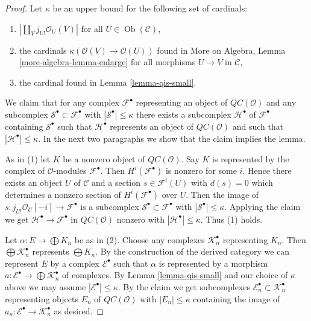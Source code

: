 \documentclass[10pt,a4paper]{amsart}
\theoremstyle{plain}
\theoremstyle{definition}
\theoremstyle{remark}
\numberwithin{equation}{subsection}
\def\Ob{\mathop{\mathrm{Ob}}\nolimits}
\begin{document}
\begin{proof}
Let $\kappa$ be an upper bound for the following set of cardinals:
\begin{enumerate}
\item $|\coprod_V j_{U!}\mathcal{O}_U(V)|$ for all $U \in \Ob(\mathcal{C})$,
\item the cardinals $\kappa(\mathcal{O}(V) \to \mathcal{O}(U))$
found in More on Algebra, Lemma \ref{more-algebra-lemma-enlarge}
for all morphisms $U \to V$ in $\mathcal{C}$,
\item the cardinal found in Lemma \ref{lemma-qis-small}.
\end{enumerate}
We claim that for any complex $\mathcal{F}^\bullet$ representing an object of
$\mathit{QC}(\mathcal{O})$ and any subcomplex
$\mathcal{S}^\bullet \subset \mathcal{F}^\bullet$
with $|\mathcal{S}^\bullet| \leq \kappa$ there exists a subcomplex
$\mathcal{H}^\bullet$ of $\mathcal{F}^\bullet$ containing $\mathcal{S}^\bullet$
such that $\mathcal{H}^\bullet$ represents an object of
$\mathit{QC}(\mathcal{O})$
and such that $|\mathcal{H}^\bullet| \leq \kappa$.
In the next two paragraphs we show that the claim implies the lemma.

\medskip\noindent
As in (1) let $K$ be a nonzero object of $\mathit{QC}(\mathcal{O})$.
Say $K$ is represented by the complex
of $\mathcal{O}$-modules $\mathcal{F}^\bullet$. Then $H^i(\mathcal{F}^\bullet)$
is nonzero for some $i$. Hence there exists an object $U$ of $\mathcal{C}$
and a section $s \in \mathcal{F}^i(U)$ with $d(s) = 0$ which determines a
nonzero section of $H^i(\mathcal{F}^\bullet)$ over $U$. Then the image
of $s : j_{U!}\mathcal{O}_U[-i] \to \mathcal{F}^\bullet$ is a subcomplex
$\mathcal{S}^\bullet \subset \mathcal{F}^\bullet$ with
$|\mathcal{S}^\bullet| \leq \kappa$. Applying the claim we get
$\mathcal{H}^\bullet \to \mathcal{F}^\bullet$ in
$\mathit{QC}(\mathcal{O})$ nonzero
with $|\mathcal{H}^\bullet| \leq \kappa$. Thus (1) holds.

\medskip\noindent
Let $\alpha : E \to \bigoplus K_n$ be as in (2).
Choose any complexes $\mathcal{K}_n^\bullet$ representing $K_n$.
Then $\bigoplus \mathcal{K}_n^\bullet$ represents $\bigoplus K_n$.
By the construction of the derived category we can represent
$E$ by a complex $\mathcal{E}^\bullet$ such that $\alpha$
is represented by a morphism
$a : \mathcal{E}^\bullet \to \bigoplus \mathcal{K}_n^\bullet$
of complexes. By Lemma \ref{lemma-qis-small} and our choice of
$\kappa$ above we may assume
$|\mathcal{E}^\bullet| \leq \kappa$. By the claim
we get subcomplexes $\mathcal{E}_n^\bullet \subset \mathcal{K}_n^\bullet$
representing objects $E_n$ of
$\mathit{QC}(\mathcal{O})$ with $|E_n| \leq \kappa$
containing the image of $a_n : \mathcal{E}^\bullet \to \mathcal{K}_n^\bullet$
as desired.


\end{proof}
\end{document}
